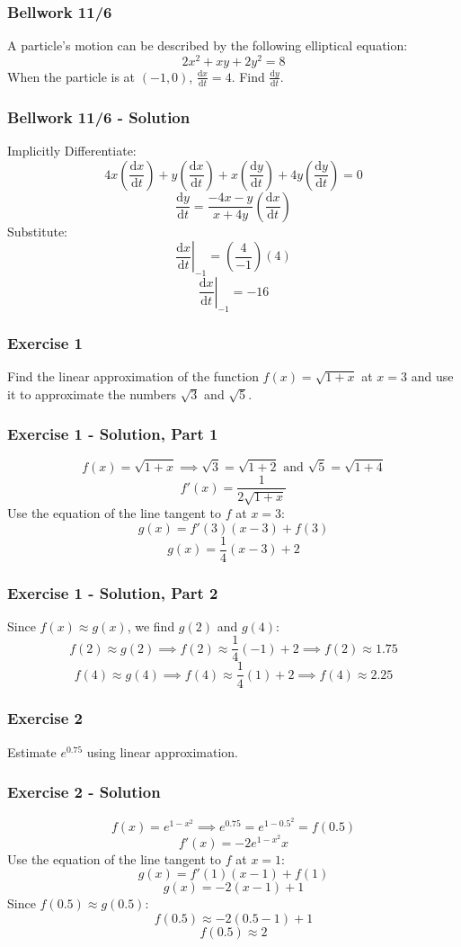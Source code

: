 \documentclass[12pt]{beamer}
\newcommand\at[2]{\left.#1\right|_{#2}}
\begin{document}
\begin{frame}
	\frametitle{Bellwork 11/6}
	\initclock

	\vfill
	\vfill
	\vfill
	\Large
	A particle's motion can be described by the following elliptical equation: \[2x^2+xy+2y^2=8\]
	When the particle is at $(-1,0)$, $\frac{\mathrm{d}x}{\mathrm{d}t}=4$.
	\vfill
	Find $\frac{\mathrm{d}y}{\mathrm{d}t}$.
	\vfill
	\vfill
	\vfill

	\small
	\crono
\end{frame}
\begin{frame}
	\frametitle{Bellwork 11/6 - Solution}

	Implicitly Differentiate:
	\[4x\left(\frac{\mathrm{d}x}{\mathrm{d}t}\right)+y\left(\frac{\mathrm{d}x}{\mathrm{d}t}\right)+x\left(\frac{\mathrm{d}y}{\mathrm{d}t}\right)+4y\left(\frac{\mathrm{d}y}{\mathrm{d}t}\right)=0\]
	\[\frac{\mathrm{d}y}{\mathrm{d}t}=\frac{-4x-y}{x+4y}\left(\frac{\mathrm{d}x}{\mathrm{d}t}\right)\]
	Substitute:
	\[\at{\frac{\mathrm{d}x}{\mathrm{d}t}}{-1}=\left(\frac{4}{-1}\right)\left(4\right)\]
	\[\boxed{\at{\frac{\mathrm{d}x}{\mathrm{d}t}}{-1}=-16}\]
\end{frame}
\begin{frame}
	\frametitle{Exercise 1}

	Find the linear approximation of the function $f(x)=\sqrt{1+x}$ at $x=3$ and use it to approximate the numbers $\sqrt{3}$ and $\sqrt{5}$.
\end{frame}
\begin{frame}
	\frametitle{Exercise 1 - Solution, Part 1}

	\large
	\[f(x)=\sqrt{1+x}\implies \sqrt{3}=\sqrt{1+2}\text{ and }\sqrt{5}=\sqrt{1+4}\]
	\[f'(x)=\frac{1}{2\sqrt{1+x}}\]
	\vfill
	Use the equation of the line tangent to $f$ at $x=3$:
	\[g(x)=f'(3)(x-3)+f(3)\]
	\[g(x)=\frac{1}{4}(x-3)+2\]
\end{frame}
\begin{frame}
	\frametitle{Exercise 1 - Solution, Part 2}

	\large
	Since $f(x)\approx g(x)$, we find $g(2)$ and $g(4)$:
	\[f(2)\approx g(2)\implies f(2)\approx \frac{1}{4}(-1)+2\implies \boxed{f(2)\approx 1.75}\]
	\[f(4)\approx g(4)\implies f(4)\approx \frac{1}{4}(1)+2\implies \boxed{f(4)\approx 2.25}\]
\end{frame}
\begin{frame}
	\frametitle{Exercise 2}

	\Large
	\begin{center}
		Estimate $e^{0.75}$ using linear approximation.
	\end{center}
\end{frame}
\begin{frame}
	\frametitle{Exercise 2 - Solution}

	\[f(x)=e^{1-x^2}\implies e^{0.75}=e^{1-0.5^2}=f(0.5)\]
	\[f'(x)=-2e^{1-x^2}x\]
	\vfill
	Use the equation of the line tangent to $f$ at $x=1$:
	\[g(x)=f'(1)(x-1)+f(1)\]
	\[g(x)=-2(x-1)+1\]
	Since $f(0.5)\approx g(0.5)$:
	\[f(0.5)\approx -2(0.5-1)+1\]
	\[\boxed{f(0.5)\approx 2}\]
\end{frame}
\end{document}
